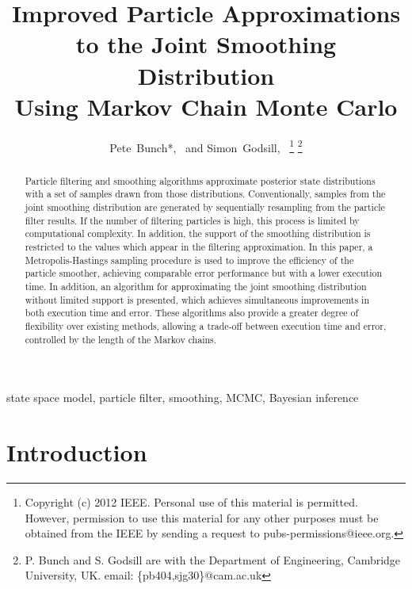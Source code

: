 \documentclass[peerreview,11pt,draftcls,onecolumn]{IEEEtran}
\begin{document}
\title{Improved Particle Approximations \\ to the Joint Smoothing Distribution \\ Using Markov Chain Monte Carlo}

\author{Pete~Bunch*,~ and
        Simon~Godsill,~%
\thanks{Copyright (c) 2012 IEEE. Personal use of this material is permitted. However, permission to use this material for any other purposes must be obtained from the IEEE by sending a request to pubs-permissions@ieee.org.}
\thanks{P. Bunch and S. Godsill are with the Department
of Engineering, Cambridge University, UK. email: \{pb404,sjg30\}@cam.ac.uk}%
}

\maketitle

\begin{abstract}
Particle filtering and smoothing algorithms approximate posterior state distributions with a set of samples drawn from those distributions. Conventionally, samples from the joint smoothing distribution are generated by sequentially resampling from the particle filter results. If the number of filtering particles is high, this process is limited by computational complexity. In addition, the support of the smoothing distribution is restricted to the values which appear in the filtering approximation. In this paper, a Metropolis-Hastings sampling procedure is used to improve the efficiency of the particle smoother, achieving comparable error performance but with a lower execution time. In addition, an algorithm for approximating the joint smoothing distribution without limited support is presented, which achieves simultaneous improvements in both execution time and error. These algorithms also provide a greater degree of flexibility over existing methods, allowing a trade-off between execution time and error, controlled by the length of the Markov chains.
\end{abstract}

\begin{IEEEkeywords}
state space model, particle filter, smoothing, MCMC, Bayesian inference
\end{IEEEkeywords}

\section{Introduction} \label{sec:intro}
\end{document}

